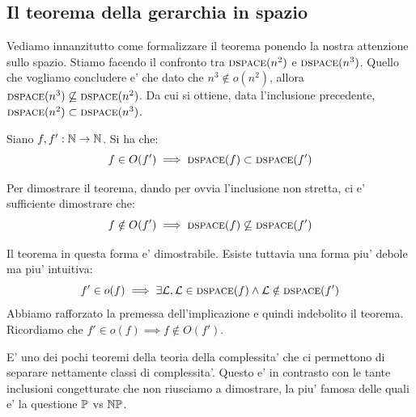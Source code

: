 \subsection{Il teorema della gerarchia in spazio}

Vediamo innanzitutto come formalizzare il teorema ponendo la nostra attenzione sullo spazio.  Stiamo
facendo il confronto tra $\textsc{dspace}(n^{2})$ e $\textsc{dspace}(n^{3})$. Quello che vogliamo concludere e' che
dato che $n^{3} \notin o(n^{2})$, allora $\textsc{dspace}(n^{3}) \not\subseteq \textsc{dspace}(n^{2})$. Da cui si
ottiene, data l'inclusione precedente, $\textsc{dspace}(n^{2}) \subset \textsc{dspace}(n^{3})$.

\begin{thm}
    Siano $f,f':\mathbb{N} \to \mathbb{N}$. Si ha che:
    \begin{equation*}
        f \in O(f') \implies \textsc{dspace}(f) \subset \textsc{dspace}(f')
    \end{equation*}
\end{thm}

Per dimostrare il teorema, dando per ovvia l'inclusione non stretta, ci e' sufficiente dimostrare
che:
\begin{equation*}
    f \notin O(f') \implies \textsc{dspace}(f) \not\subseteq \textsc{dspace}(f')
\end{equation*}

Il teorema in questa forma e' dimostrabile. Esiste tuttavia una forma piu' debole ma piu' intuitiva:
\begin{equation*}
    f' \in o(f) \implies \exists \mathcal{L}, \mathcal{L} \in \textsc{dspace}(f) \land \mathcal{L} \notin \textsc{dspace}(f')
\end{equation*}
Abbiamo rafforzato la premessa dell'implicazione e quindi indebolito il teorema. Ricordiamo che $f'
\in o(f) \implies f \notin O(f')$.

E' uno dei pochi teoremi della teoria della complessita' che ci permettono di separare nettamente
classi di complessita'. Questo e' in contrasto con le tante inclusioni congetturate che non
riusciamo a dimostrare, la piu' famosa delle quali e' la questione $\mathbb{P}$  vs $\mathbb{NP}$.

